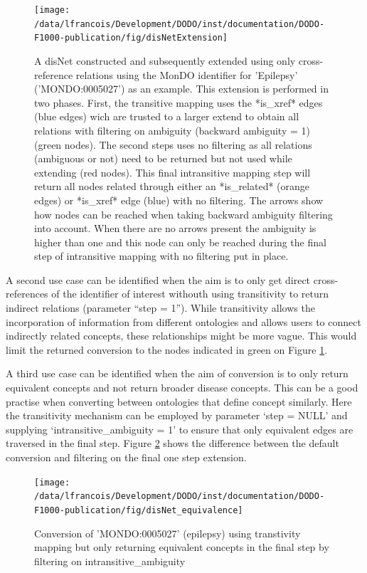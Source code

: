 \documentclass[9pt,a4paper,]{extarticle}
\begin{document}
\begin{figure}

{\centering \texttt{[image: /data/lfrancois/Development/DODO/inst/documentation/DODO-F1000-publication/fig/disNetExtension]} 

}

\caption{A disNet constructed and subsequently extended using only cross-reference relations using the MonDO identifier for 'Epilepsy' ('MONDO:0005027') as an example. This extension is performed in two phases. First, the transitive mapping uses the *is\_xref* edges (blue edges) wich are trusted to a larger extend to obtain all relations with filtering on ambiguity (backward ambiguity = 1) (green nodes). The second steps uses no filtering as all relations (ambiguous or not) need to be returned but not used while extending (red nodes). This final intransitive mapping step will return all nodes related through either an *is\_related* (orange edges) or *is\_xref* edge (blue) with no filtering. The arrows show how nodes can be reached when taking backward ambiguity filtering into account. When there are no arrows present the ambiguity is higher than one and this node can only be reached during the final step of intransitive mapping with no filtering put in place.}\label{fig:extension}
\end{figure}

A second use case can be identified when the aim is to only get direct cross-references of the identifier of interest withouth using transitivity to return indirect relations (parameter ``step = 1''). While transitivity allows the incorporation of information from different ontologies and allows users to connect indirectly related concepts, these relationships might be more vague. This would limit the returned conversion to the nodes indicated in green on Figure \ref{fig:extension}.

A third use case can be identified when the aim of conversion is to only return equivalent concepts and not return broader disease concepts. This can be a good practise when converting between ontologies that define concept similarly. Here the transitivity mechanism can be employed by parameter `step = NULL' and supplying `intransitive\_ambiguity = 1' to ensure that only equivalent edges are traversed in the final step. Figure \ref{fig:equivalentConversion} shows the difference between the default conversion and filtering on the final one step extension.

\begin{figure}

{\centering \texttt{[image: /data/lfrancois/Development/DODO/inst/documentation/DODO-F1000-publication/fig/disNet\_equivalence]} 

}

\caption{Conversion of 'MONDO:0005027' (epilepsy) using transtivity mapping but only returning equivalent concepts in the final step by filtering on intransitive\_ambiguity}\label{fig:equivalentConversion}
\end{figure}
\end{document}
